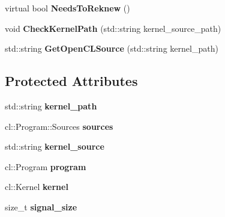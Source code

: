 \begin{DoxyCompactItemize}
\item 
virtual bool {\bfseries Needs\+To\+Reknew} ()\hypertarget{classjaspl_1_1ocl_1_1_task_item_a20e681f2c7b9930f99fc73ece96cb67c}{}\label{classjaspl_1_1ocl_1_1_task_item_a20e681f2c7b9930f99fc73ece96cb67c}

\item 
void {\bfseries Check\+Kernel\+Path} (std\+::string kernel\+\_\+source\+\_\+path)\hypertarget{classjaspl_1_1ocl_1_1_task_item_af048f07b953902e9ac048fb32dc86535}{}\label{classjaspl_1_1ocl_1_1_task_item_af048f07b953902e9ac048fb32dc86535}

\item 
std\+::string {\bfseries Get\+Open\+C\+L\+Source} (std\+::string kernel\+\_\+path)\hypertarget{classjaspl_1_1ocl_1_1_task_item_a015a0fc3c5fe671b6f9d529a77cb4132}{}\label{classjaspl_1_1ocl_1_1_task_item_a015a0fc3c5fe671b6f9d529a77cb4132}

\end{DoxyCompactItemize}
\subsection*{Protected Attributes}
\begin{DoxyCompactItemize}
\item 
std\+::string {\bfseries kernel\+\_\+path}\hypertarget{classjaspl_1_1ocl_1_1_task_item_aa08a1b3eaff97acd4083d81de0d78de9}{}\label{classjaspl_1_1ocl_1_1_task_item_aa08a1b3eaff97acd4083d81de0d78de9}

\item 
cl\+::\+Program\+::\+Sources {\bfseries sources}\hypertarget{classjaspl_1_1ocl_1_1_task_item_acf5a7b33791d535255f524dd7bdafa2d}{}\label{classjaspl_1_1ocl_1_1_task_item_acf5a7b33791d535255f524dd7bdafa2d}

\item 
std\+::string {\bfseries kernel\+\_\+source}\hypertarget{classjaspl_1_1ocl_1_1_task_item_a90439204dd331c6a4f488e3c6016ddfa}{}\label{classjaspl_1_1ocl_1_1_task_item_a90439204dd331c6a4f488e3c6016ddfa}

\item 
cl\+::\+Program {\bfseries program}\hypertarget{classjaspl_1_1ocl_1_1_task_item_afd9f6878a4a075d6fbc9cb2a74f3ac2e}{}\label{classjaspl_1_1ocl_1_1_task_item_afd9f6878a4a075d6fbc9cb2a74f3ac2e}

\item 
cl\+::\+Kernel {\bfseries kernel}\hypertarget{classjaspl_1_1ocl_1_1_task_item_ab628ae818420624811dee92ce68615fd}{}\label{classjaspl_1_1ocl_1_1_task_item_ab628ae818420624811dee92ce68615fd}

\item 
size\+\_\+t {\bfseries signal\+\_\+size}\hypertarget{classjaspl_1_1ocl_1_1_task_item_a8a21af3a15a0010ae139cc6b0555c380}{}\label{classjaspl_1_1ocl_1_1_task_item_a8a21af3a15a0010ae139cc6b0555c380}

\end{DoxyCompactItemize}
